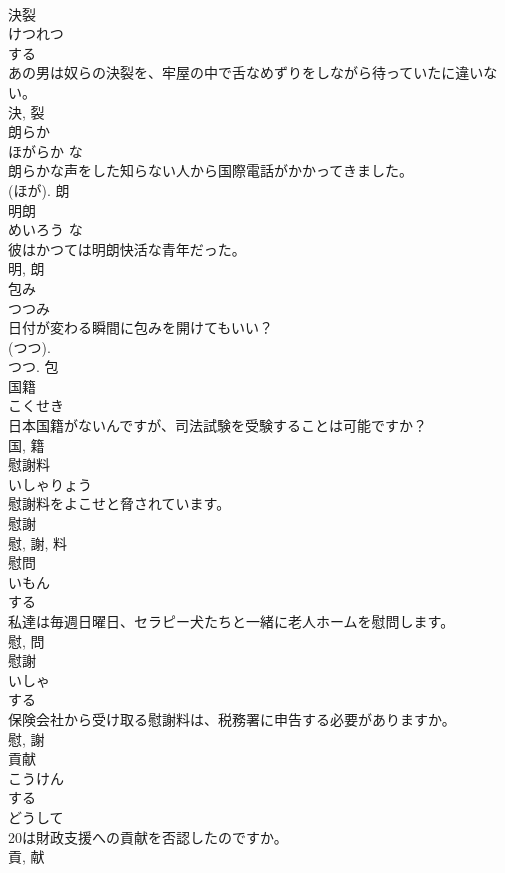 \documentclass[8pt]{extreport}
\begin{document}
\begin{CJK}{UTF8}{min}
\\	決裂	
\\	けつれつ	
\\	する 
\\	あの男は奴らの決裂を、牢屋の中で舌なめずりをしながら待っていたに違いない。	
\\	決, 裂	
\\	朗らか	
\\	ほがらか	な 
\\	朗らかな声をした知らない人から国際電話がかかってきました。	
\\	(ほが).	朗	
\\	明朗	
\\	めいろう	な 
\\	彼はかつては明朗快活な青年だった。	
\\	明, 朗	
\\	包み	
\\	つつみ	
\\	日付が変わる瞬間に包みを開けてもいい？	
\\	(つつ). 
\\	つつ.	包	
\\	国籍	
\\	こくせき	
\\	日本国籍がないんですが、司法試験を受験することは可能ですか？	
\\	国, 籍	
\\	慰謝料	
\\	いしゃりょう	
\\	慰謝料をよこせと脅されています。	
\\	慰謝 
\\	慰, 謝, 料	
\\	慰問	
\\	いもん	
\\	する 
\\	私達は毎週日曜日、セラピー犬たちと一緒に老人ホームを慰問します。	
\\	慰, 問	
\\	慰謝	
\\	いしゃ	
\\	する 
\\	保険会社から受け取る慰謝料は、税務署に申告する必要がありますか。	
\\	慰, 謝	
\\	貢献	
\\	こうけん	
\\	する 
\\	どうして
\\	20は財政支援への貢献を否認したのですか。	
\\	貢, 献	

\end{CJK}
\end{document}
